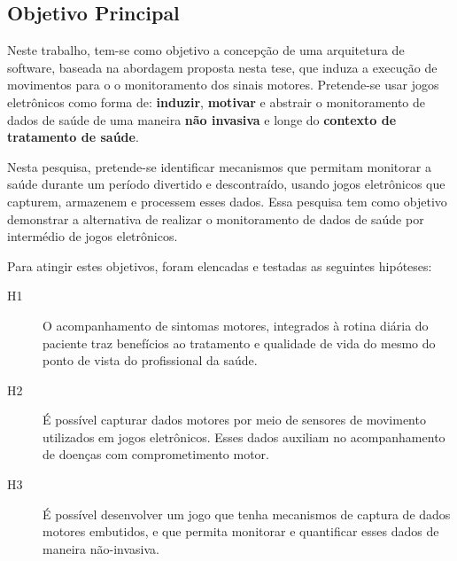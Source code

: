 \subsection{Objetivo Principal}
Neste trabalho, tem-se como objetivo a concepção de uma arquitetura de software, baseada na abordagem proposta nesta tese, que induza a execução de movimentos para o o monitoramento dos sinais motores. Pretende-se usar jogos eletrônicos como forma de: \textbf{induzir}, \textbf{motivar} e abstrair o monitoramento de dados de saúde de uma maneira \textbf{não invasiva} e longe do \textbf{contexto de tratamento de saúde}.


Nesta pesquisa, pretende-se identificar mecanismos que permitam monitorar a saúde durante um período divertido e descontraído, usando jogos eletrônicos que capturem, armazenem  e processem esses dados. Essa pesquisa tem como objetivo demonstrar a alternativa de realizar o monitoramento de dados de saúde por intermédio de jogos eletrônicos.

Para atingir estes objetivos, foram elencadas e testadas as seguintes hipóteses:
	\begin{description}
	\item[H1] O acompanhamento de sintomas motores, integrados à rotina diária do paciente traz benefícios ao tratamento e qualidade de vida do mesmo do ponto de vista do profissional da saúde.
	\item[H2] É possível capturar dados motores por meio de sensores de movimento utilizados em jogos eletrônicos. Esses dados auxiliam no acompanhamento de doenças com comprometimento motor.
	\item[H3] É possível desenvolver um jogo que tenha mecanismos de captura de dados motores embutidos, e que permita monitorar e quantificar esses dados de maneira não-invasiva.
	\end{description}
	
